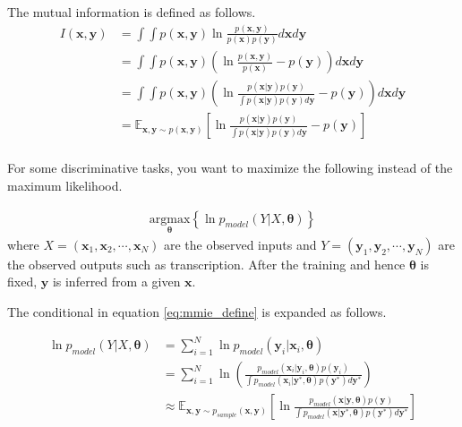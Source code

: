 \documentclass[a4]{article}
\begin{document}
The mutual information is defined as follows.
\begin{equation}
\begin{aligned}
I(\bm{x},\bm{y}) &= \int \int p(\bm{x},\bm{y})\ln\frac{p(\bm{x},\bm{y})}{p(\bm{x})p(\bm{y})} d\bm{x}d\bm{y}\\
&=\int \int p(\bm{x},\bm{y})\left(\ln\frac{p(\bm{x},\bm{y})}{p(\bm{x})} - p(\bm{y})\right) d\bm{x}d\bm{y}\\
&=\int \int p(\bm{x},\bm{y})\left(
\ln\frac{ p(\bm{x}|\bm{y})p(\bm{y}) }
        { \int p(\bm{x}|\bm{y})p(\bm{y}) d\bm{y} }
- p(\bm{y})
\right) d\bm{x}d\bm{y}\\
&=
\mathbb{E}_{\bm{x},\bm{y} \sim p(\bm{x},\bm{y})}\left[
\ln\frac{ p(\bm{x}|\bm{y})p(\bm{y}) }
        { \int p(\bm{x}|\bm{y})p(\bm{y}) d\bm{y} }
- p(\bm{y})
\right]\\
\end{aligned}
\end{equation}

For some discriminative tasks, you want to maximize the following instead of the maximum likelihood.

\begin{equation}
\begin{aligned}
\underset{\bm{\theta}}{\mathrm{argmax}}\left\{
\ln p_{model}(Y|X, \bm{\theta})
\right\}\label{eq:mmie_define}
\end{aligned}
\end{equation}
where $X = (\bm{x}_1, \bm{x}_2, \cdots, \bm{x}_N)$ are the observed inputs and
 $Y = (\bm{y}_1, \bm{y}_2, \cdots, \bm{y}_N)$ are the observed outputs such as transcription.
After the training and hence $\bm{\theta}$ is fixed, $\bm{y}$ is inferred from a given $\bm{x}$.

The conditional in equation \ref{eq:mmie_define} is expanded as follows.

\begin{equation}
\begin{aligned}
\ln p_{model}(Y|X, \bm{\theta}) &=
\sum_{i=1}^N \ln p_{model}(\bm{y}_i|\bm{x}_i, \bm{\theta})\\
&=
\sum_{i=1}^N \ln \left(
\frac{ p_{model}(\bm{x}_i|\bm{y}_i, \bm{\theta}) p(\bm{y}_i) }
     { \int p_{model}(\bm{x}_i|\bm{y}^*, \bm{\theta}) p(\bm{y}^*)d\bm{y}^* }
\right)\\
&\approx
\mathbb{E}_{\bm{x},\bm{y} \sim p_{sample}(\bm{x},\bm{y})}\left[
\ln \frac{ p_{model}(\bm{x}|\bm{y}, \bm{\theta}) p(\bm{y}) }
     { \int p_{model}(\bm{x}|\bm{y}^*, \bm{\theta}) p(\bm{y}^*)d\bm{y}^* }
\right]\\
\end{aligned}
\end{equation}
\end{document}
